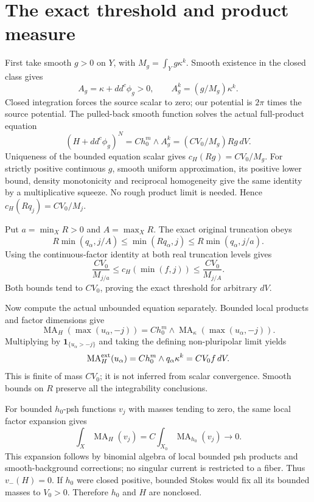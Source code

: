 \documentclass[11pt]{article}
\newcommand{\ddc}{dd^c}
\newcommand{\MA}{\operatorname{MA}}
\theoremstyle{remark}\newtheorem{remark}[theorem]{Remark}
\begin{document}
\section{The exact threshold and product measure}
First take smooth $g>0$ on $Y$, with $M_g=\int_Yg\kappa^k$.
Smooth existence in the closed class \cite[Corollary 1]{TW} gives
\[
 A_g=\kappa+\ddc\phi_g>0,\qquad A_g^k=(g/M_g)\kappa^k.
\]
Closed integration forces the source scalar to zero; our potential
is $2\pi$ times the source potential. The pulled-back smooth function
solves the actual full-product equation
\[
 (H+\ddc\phi_g)^N=C h_0^m\wedge A_g^k
                  =(CV_0/M_g)R g\,dV.
\]
Uniqueness of the bounded equation scalar gives $c_H(Rg)=CV_0/M_g$.
For strictly positive continuous $g$, smooth uniform approximation,
its positive lower bound, density monotonicity and reciprocal homogeneity
give the same identity by a multiplicative squeeze. No rough product
limit is needed. Hence $c_H(Rq_j)=CV_0/M_j$.

Put $a=\min_XR>0$ and $A=\max_XR$. The exact original truncation obeys
\[
 R\min(q_\alpha,j/A)\leq\min(Rq_\alpha,j)
                      \leq R\min(q_\alpha,j/a).
\]
Using the continuous-factor identity at both real truncation levels gives
\[
 \frac{CV_0}{M_{j/a}}\leq c_H(\min(f,j))
                       \leq\frac{CV_0}{M_{j/A}}.
\]
Both bounds tend to $CV_0$, proving the exact threshold for arbitrary $dV$.

Now compute the actual unbounded equation separately. Bounded local
products and factor dimensions give
\[
 \MA_H(\max(u_\alpha,-j))
   =C h_0^m\wedge\MA_\kappa(\max(u_\alpha,-j)).
\]
Multiplying by $\mathbf1_{\{u_\alpha>-j\}}$ and taking the defining
non-pluripolar limit yields
\[
 \MA_H^{\rm ext}(u_\alpha)
   =C h_0^m\wedge q_\alpha\kappa^k=CV_0 f\,dV.
\]
This is finite of mass $CV_0$; it is not inferred from scalar convergence.
Smooth bounds on $R$ preserve all the integrability conclusions.

For bounded $h_0$-psh functions $v_j$ with masses tending to zero,
the same local factor expansion gives
\[
 \int_X\MA_H(v_j)=C\int_{X_0}\MA_{h_0}(v_j)\longrightarrow0.
\]
This expansion follows by binomial algebra of local bounded psh products
and smooth-background corrections; no singular current is restricted
to a fiber. Thus $v_-(H)=0$. If $h_0$ were closed positive, bounded
Stokes would fix all its bounded masses to $V_0>0$. Therefore $h_0$
and $H$ are nonclosed.
\end{document}
